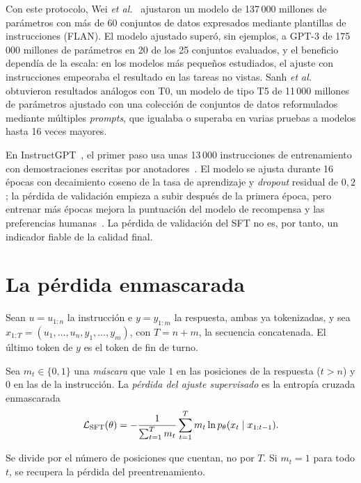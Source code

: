 Con este protocolo, Wei \emph{et al.}~\cite{wei-flan} ajustaron un modelo de 137\,000 millones de parámetros con más de 60 conjuntos de datos expresados mediante plantillas de instrucciones (FLAN). El modelo ajustado superó, sin ejemplos, a GPT-3 de 175\,000 millones de parámetros en 20 de los 25 conjuntos evaluados, y el beneficio dependía de la escala: en los modelos más pequeños estudiados, el ajuste con instrucciones empeoraba el resultado en las tareas no vistas. Sanh \emph{et al.}~\cite{sanh-t0} obtuvieron resultados análogos con T0, un modelo de tipo T5 de 11\,000 millones de parámetros ajustado con una colección de conjuntos de datos reformulados mediante múltiples \emph{prompts}, que igualaba o superaba en varias pruebas a modelos hasta 16 veces mayores.

\begin{observacion}\label{obs:instructgpt}
En InstructGPT~\cite{ouyang}, el primer paso usa unas 13\,000 instrucciones de entrenamiento con demostraciones escritas por anotadores~\cite[§3.2]{ouyang}. El modelo se ajusta durante 16 épocas con decaimiento coseno de la tasa de aprendizaje y \emph{dropout} residual de $0{,}2$; la pérdida de validación empieza a subir después de la primera época, pero entrenar más épocas mejora la puntuación del modelo de recompensa y las preferencias humanas~\cite[§3.5]{ouyang}. La pérdida de validación del SFT no es, por tanto, un indicador fiable de la calidad final.
\end{observacion}

\section{La pérdida enmascarada}

Sean $u=u_{1:n}$ la instrucción e $y=y_{1:m}$ la respuesta, ambas ya tokenizadas, y sea $x_{1:T}=(u_1,\dots,u_n,y_1,\dots,y_m)$, con $T=n+m$, la secuencia concatenada. El último token de $y$ es el token de fin de turno.

\begin{definicion}\label{def:sft}
Sea $m_t\in\{0,1\}$ una \emph{máscara} que vale $1$ en las posiciones de la respuesta ($t>n$) y $0$ en las de la instrucción. La \emph{pérdida del ajuste supervisado} es la entropía cruzada enmascarada
\[
\mathcal{L}_{\mathrm{SFT}}(\theta)=-\frac{1}{\sum_{t=1}^{T}m_t}\sum_{t=1}^{T}m_t\ln p_\theta(x_t\mid x_{1:t-1}).
\]
\end{definicion}

Se divide por el número de posiciones que cuentan, no por $T$. Si $m_t=1$ para todo $t$, se recupera la pérdida del preentrenamiento.

